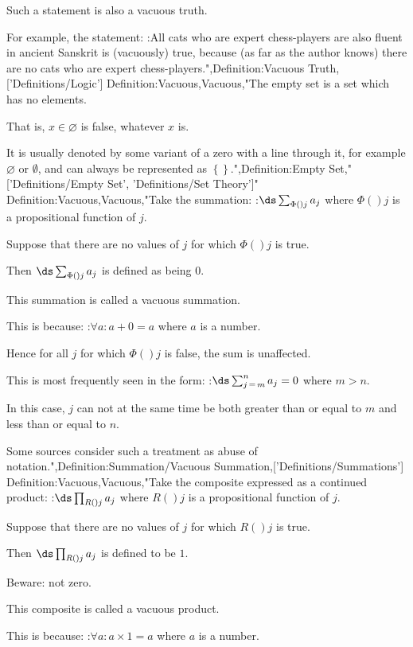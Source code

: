 Such a statement is also a vacuous truth.


For example, the statement:
:All cats who are expert chess-players are also fluent in ancient Sanskrit
is (vacuously) true, because (as far as the author knows) there are no cats who are expert chess-players.",Definition:Vacuous Truth,['Definitions/Logic']
Definition:Vacuous,Vacuous,"The empty set is a set which has no elements.

That is, $x \in \varnothing$ is false, whatever $x$ is.


It is usually denoted by some variant of a zero with a line through it, for example $\varnothing$ or $\emptyset$, and can always be represented as $\left\lbrace  \right\rbrace$.",Definition:Empty Set,"['Definitions/Empty Set', 'Definitions/Set Theory']"
Definition:Vacuous,Vacuous,"Take the summation:
:$\ds \sum_{\Phi \left(   \right)j} a_j$
where $\Phi \left(   \right)j$ is a propositional function of $j$.

Suppose that there are no values of $j$ for which $\Phi \left(   \right)j$ is true.

Then $\ds \sum_{\Phi \left(   \right)j} a_j$ is defined as being $0$.

This summation is called a vacuous summation.


This is because:
:$\forall a: a + 0 = a$
where $a$ is a number.

Hence for all $j$ for which $\Phi \left(   \right)j$ is false, the sum is unaffected.


This is most frequently seen in the form:
:$\ds \sum_{j \mathop = m}^n a_j = 0$
where $m > n$.

In this case, $j$ can not at the same time be both greater than or equal to $m$ and less than or equal to $n$.


Some sources consider such a treatment as abuse of notation.",Definition:Summation/Vacuous Summation,['Definitions/Summations']
Definition:Vacuous,Vacuous,"Take the composite expressed as a continued product:
:$\ds \prod_{R \left(   \right)j} a_j$
where $R \left(   \right)j$ is a propositional function of $j$.

Suppose that there are no values of $j$ for which $R \left(   \right)j$ is true.

Then $\ds \prod_{R \left(   \right)j} a_j$ is defined to be $1$.

Beware: not zero.

This composite is called a vacuous product.


This is because:
:$\forall a: a \times 1 = a$
where $a$ is a number.

